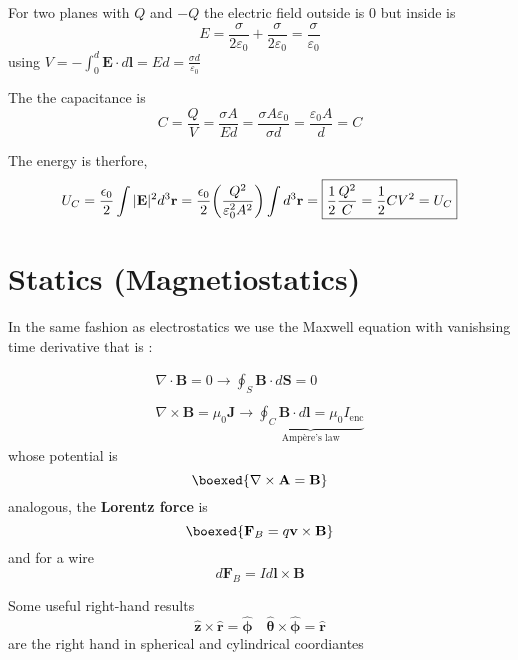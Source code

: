 \begin{example}
    For two planes with $Q$ and $-Q$ the electric field outside is 0 but inside is $$E=\frac{\sigma}{2\varepsilon_0}+\frac{\sigma}{2\varepsilon_0}=\frac{\sigma}{\varepsilon_0}$$ using $V=-\int_0^d \mathbf{E}\cdot d\mathbf{l}=Ed=\frac{\sigma d}{\varepsilon_0}$

    The the capacitance is $$C=\frac{Q}{V}=\frac{\sigma A}{E d}=\frac{\sigma A \varepsilon_0}{\sigma d}=\boxed{\frac{\varepsilon_0 A}{d}=C}$$

    The energy is therfore, $$U_C=\frac{\epsilon_{0}}{2} \int|\mathbf{E}|^{2} d^{3} \mathbf{r}=\frac{\epsilon_{0}}{2} \qty(\frac{Q^2}{\varepsilon^2_0 A^2})\int d^{3} \mathbf{r}=\boxed{\frac{1}{2}\frac{Q^2}{C}=\frac{1}{2}CV^2=U_C}$$
\end{example}

\section{Statics (Magnetiostatics)}
In the same fashion as electrostatics  we use the Maxwell equation with vanishsing time derivative that is :

$$\boxed{\begin{array}{c}
    \nabla \cdot \mathbf{B}=0  \rightarrow  \oint_{S} \mathbf{B} \cdot d \mathbf{S}=0 \\ \\
    \nabla \times \mathbf{B}=\mu_{0} \mathbf{J} \rightarrow \underbrace{\oint_{C} \mathbf{B} \cdot d \mathbf{l}=\mu_{0} I_{\mathrm{enc}}}_{\text {Ampère's law}}
    \end{array}}$$
whose potential is $$\boexed{\nabla \times \mathbf{A}=\mathbf{B}}$$ analogous, the {\bf Lorentz force} is $$\boexed{\mathbf{F}_{B}=q \mathbf{v} \times \mathbf{B}}$$
and for a wire $$\boxed{d \mathbf{F}_{B}=I d \mathbf{l} \times \mathbf{B}}$$

Some useful right-hand results $$\boxed{\hat{\mathbf{z}} \times \hat{\mathbf{r}}=\hat{\boldsymbol{\phi}} \quad \hat{\boldsymbol{\theta}} \times \hat{\boldsymbol{\phi}}=\hat{\mathbf{r}}}$$ are the right hand in spherical and cylindrical coordiantes
